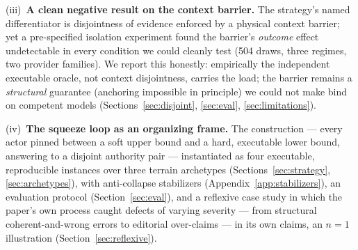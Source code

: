 \documentclass[11pt]{article}
\begin{document}
(iii)~\textbf{A clean negative result on the context barrier.} The strategy's named differentiator is
disjointness of evidence enforced by a physical context barrier; yet a pre-specified isolation experiment
found the barrier's \emph{outcome} effect undetectable in every condition we could cleanly test (504
draws, three regimes, two provider families). We report this honestly: empirically the independent
executable oracle, not context disjointness, carries the load; the barrier remains a \emph{structural}
guarantee (anchoring impossible in principle) we could not make bind on competent models
(Sections~\ref{sec:disjoint}, \ref{sec:eval}, \ref{sec:limitations}).

(iv)~\textbf{The squeeze loop as an organizing frame.} The construction --- every actor pinned
between a soft upper bound and a hard, executable lower bound, answering to a disjoint authority pair ---
instantiated as four executable, reproducible instances over three terrain archetypes
(Sections~\ref{sec:strategy}, \ref{sec:archetypes}), with anti-collapse
stabilizers (Appendix~\ref{app:stabilizers}), an evaluation protocol (Section~\ref{sec:eval}), and a
reflexive case study in which the paper's own process caught \ResReflexDefects{} defects of varying
severity --- from structural coherent-and-wrong errors to editorial over-claims --- in its own claims, an
$n{=}1$ illustration (Section~\ref{sec:reflexive}).
\end{document}

